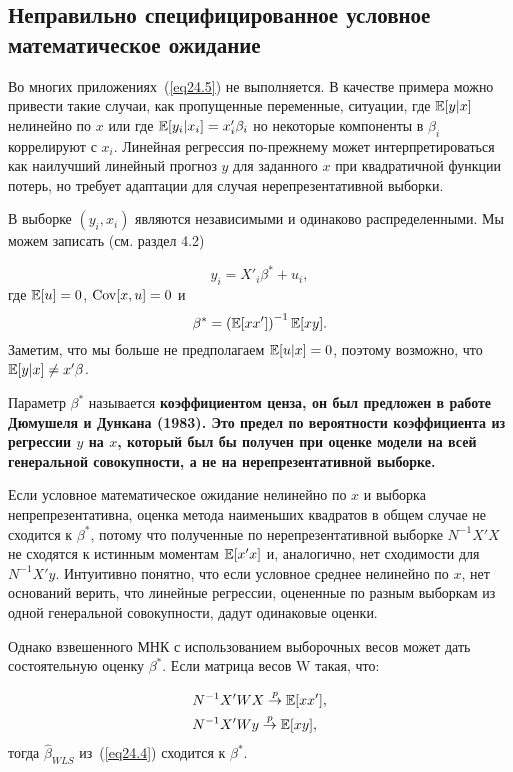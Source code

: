 \subsection*{Неправильно специфицированное условное математическое ожидание}

Во многих приложениях~(\ref{eq24.5}) не выполняется. В качестве примера можно привести такие случаи, как пропущенные переменные, ситуации, где $\mathbb{E}[y|x]$ нелинейно по $x$ или где $\mathbb{E}[y_i|x_i] = x'_i \beta_i$ но некоторые компоненты в $\beta_i$ коррелируют с $x_i$. Линейная регрессия по-прежнему может интерпретироваться как наилучший линейный прогноз $y$ для заданного $x$ при квадратичной функции потерь, но требует адаптации для случая нерепрезентативной выборки. 

В выборке $(y_i, x_i)$ являются независимыми и одинаково распределенными. Мы можем записать (см. раздел 4.2)

$$y_i = X'_i \beta^* + u_i,$$
где $\mathbb{E}[u]=0$, $\mathrm{Cov}[x,u] = 0$ и
$$\beta^* = \left( \mathbb{E}[xx'] \right) ^{-1} \mathbb{E}[xy]. $$
Заметим, что мы больше не предполагаем $\mathbb{E}[u|x] = 0$, поэтому возможно, что $\mathbb{E}[y|x] \ne x'\beta$. 

Параметр $\beta^*$ называется \bfseries коэффициентом ценза, \mdseries он был предложен в работе Дюмушеля и Дункана (1983). Это предел по вероятности коэффициента из регрессии $y$ на $x$, который был бы получен при оценке модели на всей генеральной совокупности, а не на нерепрезентативной выборке. 

Если условное математическое ожидание нелинейно по $x$ и выборка непрепрезентативна, оценка метода наименьших квадратов в общем случае не сходится к $\beta^*$, потому что полученные по нерепрезентативной выборке $N^{-1}X'X$ не сходятся к истинным моментам $\mathbb{E}[x'x]$ и, аналогично, нет сходимости для $N^{-1}X'y$. Интуитивно понятно, что если условное среднее нелинейно по $x$, нет оснований верить, что линейные регрессии, оцененные по разным выборкам из одной генеральной совокупности, дадут одинаковые оценки. 

Однако взвешенного МНК с использованием выборочных весов может дать состоятельную оценку $\beta^*$. Если матрица весов W такая, что:

\begin{align}
\label{eq24.6}
&N^{-1}X'WX \overset{p}{\to}  \mathbb{E}[xx'], \nonumber \\
&N^{-1}X'Wy \overset{p}{\to}  \mathbb{E}[xy],
\end{align}
тогда $\hat \beta _{WLS} $ из~(\ref{eq24.4}) сходится к $\beta^*$. 

